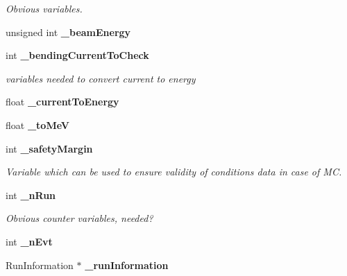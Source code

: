 \begin{DoxyCompactItemize}
\begin{DoxyCompactList}\small\item\em Obvious variables. \item\end{DoxyCompactList}\item 
unsigned int {\bfseries \_\-beamEnergy}\label{classmarlin_1_1RunInfoProcessor_a06b6da5104e1817215b1588452dd1dd8}

\item 
int {\bf \_\-bendingCurrentToCheck}\label{classmarlin_1_1RunInfoProcessor_ad17af4643c8798dab2642df821a87952}

\begin{DoxyCompactList}\small\item\em variables needed to convert current to energy \item\end{DoxyCompactList}\item 
float {\bfseries \_\-currentToEnergy}\label{classmarlin_1_1RunInfoProcessor_aec2e8768e37e8807479bec91314b7742}

\item 
float {\bfseries \_\-toMeV}\label{classmarlin_1_1RunInfoProcessor_abbcb57bbb8ed02b4cfd48e81e5792d60}

\item 
int {\bf \_\-safetyMargin}\label{classmarlin_1_1RunInfoProcessor_aaf0d50434eb4366d31750a485d105294}

\begin{DoxyCompactList}\small\item\em Variable which can be used to ensure validity of conditions data in case of MC. \item\end{DoxyCompactList}\item 
int {\bf \_\-nRun}\label{classmarlin_1_1RunInfoProcessor_a424bd272282d83451deec7a1b3ed65d6}

\begin{DoxyCompactList}\small\item\em Obvious counter variables, needed? \item\end{DoxyCompactList}\item 
int {\bfseries \_\-nEvt}\label{classmarlin_1_1RunInfoProcessor_abfcb80607e137bb4cac4a50cb0704a07}

\item 
RunInformation $\ast$ {\bf \_\-runInformation}\label{classmarlin_1_1RunInfoProcessor_ac4fc44266d6145b8190937b9cce47c8e}


\end{DoxyCompactItemize}
